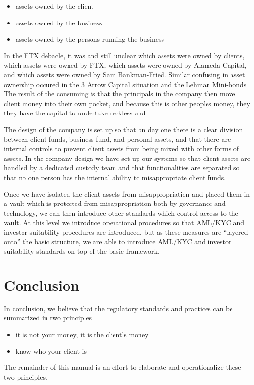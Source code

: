 \begin{itemize}
\item assets owned by the client
\item assets owned by the business
\item assets owned by the persons running the business
\end{itemize}

In the FTX debacle, it was and still unclear which assets were owned
by clients, which assets were owned by FTX, which assets were owned by
Alameda Capital, and which assets were owned by Sam Bankman-Fried.
Similar confusing in asset ownership occured in the 3 Arrow Capital
situation and the Lehman Mini-bonds   The result of the consuming is
that the principals in the company then move client money into their
own pocket, and because this is other peoples money, they they have
the capital to undertake reckless and 

The design of the company is set up so that on day one there is a
clear division between client funds, business fund, and personal
assets, and that there are internal controls to prevent client assets
from being mixed with other forms of assets.  In the company design we
have set up our systems so that client assets are handled by a
dedicated custody team and that functionalities are separated so that
no one person has the internal ability to misappropriate client funds.

Once we have isolated the client assets from misappropriation and
placed them in a vault which is protected from misappropriation both
by governance and technology, we can then introduce other standards
which control access to the vault.  At this level we introduce
operational procedures so that AML/KYC and investor suitability
procedures are introduced, but as these measures are ``layered onto''
the basic structure, we are able to introduce AML/KYC and investor
suitability standards on top of the basic framework.

\section{Conclusion}
In conclusion, we believe that the regulatory standards and practices
can be summarized in two principles

\begin{itemize}
\item it is not your money, it is the client's money
\item know who your client is
\end{itemize}

The remainder of this manual is an effort to elaborate and
operationalize these two principles.

